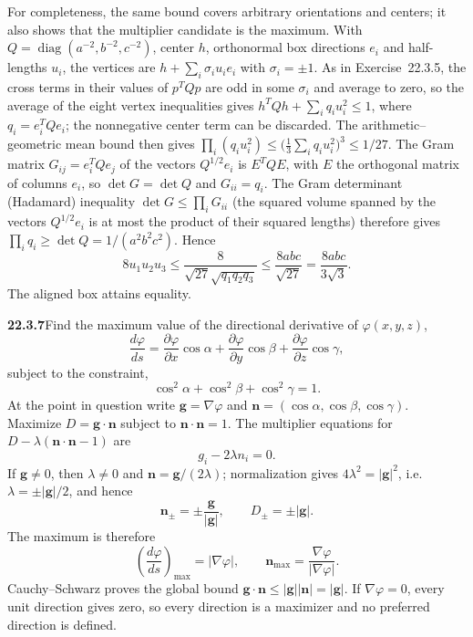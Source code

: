 For completeness, the same bound covers arbitrary orientations and
centers; it also shows that the multiplier candidate is the maximum.
With $Q=\operatorname{diag}(a^{-2},b^{-2},c^{-2})$, center $h$,
orthonormal box directions $e_i$ and half-lengths $u_i$, the vertices
are $h+\sum_i\sigma_iu_ie_i$ with $\sigma_i=\pm1$. As in
Exercise~22.3.5, the cross terms in their values of $p^TQp$ are odd in
some $\sigma_i$ and average to zero, so the average of the eight vertex
inequalities gives $h^TQh+\sum_iq_iu_i^2\le1$, where $q_i=e_i^TQe_i$;
the nonnegative center term can be discarded. The arithmetic--geometric
mean bound then gives
$\prod_i(q_iu_i^2)\le\bigl(\frac13\sum_iq_iu_i^2\bigr)^3\le1/27$.
The Gram matrix $G_{ij}=e_i^TQe_j$ of the vectors $Q^{1/2}e_i$ is
$E^TQE$, with $E$ the orthogonal matrix of columns $e_i$, so
$\det G=\det Q$ and $G_{ii}=q_i$. The Gram determinant (Hadamard)
inequality $\det G\le\prod_iG_{ii}$ (the squared volume spanned by the
vectors $Q^{1/2}e_i$ is at most the product of their squared lengths)
therefore gives $\prod_iq_i\ge\det Q=1/(a^2b^2c^2)$. Hence
\[
8u_1u_2u_3\le\frac8{\sqrt{27}\sqrt{q_1q_2q_3}}
\le\frac{8abc}{\sqrt{27}}=\frac{8abc}{3\sqrt3}.
\]
The aligned box attains equality.


\par\bigskip
\noindent\textbf{22.3.7}\quad Find the maximum value of the
directional derivative of $\varphi(x,y,z)$,
\[
\frac{d\varphi}{ds}=\frac{\partial\varphi}{\partial x}\cos\alpha
+\frac{\partial\varphi}{\partial y}\cos\beta
+\frac{\partial\varphi}{\partial z}\cos\gamma,
\]
subject to the constraint,
\[
\cos^{2}\alpha+\cos^{2}\beta+\cos^{2}\gamma=1.
\]
\solution
At the point in question write $\mathbf g=\nabla\varphi$ and
$\mathbf n=(\cos\alpha,\cos\beta,\cos\gamma)$.
Maximize $D=\mathbf g\cdot\mathbf n$ subject to
$\mathbf n\cdot\mathbf n=1$. The multiplier equations for
$D-\lambda(\mathbf n\cdot\mathbf n-1)$ are
\[
g_i-2\lambda n_i=0.
\]
If $\mathbf g\ne0$, then $\lambda\ne0$ and
$\mathbf n=\mathbf g/(2\lambda)$; normalization gives
$4\lambda^2=|\mathbf g|^2$, i.e. $\lambda=\pm|\mathbf g|/2$, and hence
\[
\mathbf n_\pm=\pm\frac{\mathbf g}{|\mathbf g|},\qquad
D_\pm=\pm|\mathbf g|.
\]
The maximum is therefore
\[
\boxed{\left(\frac{d\varphi}{ds}\right)_{\max}
=|\nabla\varphi|,\qquad
\mathbf n_{\max}=\frac{\nabla\varphi}{|\nabla\varphi|}}.
\]
Cauchy--Schwarz proves the global bound
$\mathbf g\cdot\mathbf n\le|\mathbf g||\mathbf n|=|\mathbf g|$.
If $\nabla\varphi=0$, every unit direction gives zero, so every
direction is a maximizer and no preferred direction is defined.


